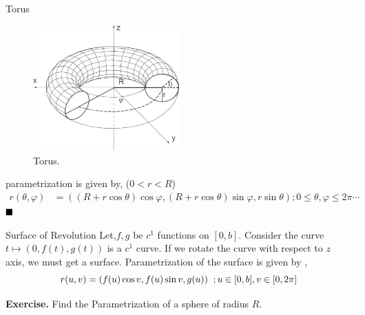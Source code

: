\documentclass[Analysis-3]{subfiles}
\begin{document}
\begin{Eg}{Torus}{}
    
    \begin{figure}[H]
        \centering
        \includegraphics[width=0.5\textwidth]{figures/lec-24.3.png}
        \caption{Torus.}
    \end{figure}

    parametrization is given by, ($0<r<R$)
    \begin{align*} \label{eq:5}
        r(\theta , \varphi) &= ((R+r\cos \theta)\cos \varphi,(R+r\cos \theta)\sin \varphi , r \sin \theta) ; 0\le \theta , \varphi \le 2\pi \cdots 
    \end{align*} $\hfill \blacksquare$
\end{Eg}

\begin{Eg}{Surface of Revolution}{}
   Let,$f,g$ be $c^1$ functions on $[0,b]$. Consider the curve $t \mapsto (0,f(t),g(t))$ is a $c^1$ curve. If we rotate the curve with respect to $z$ axis, we must get a surface. Parametrization  of the surface is given by ,
   \[r(u,v) = (f(u)\cos v,f(u)\sin v,g(u)) \hspace{0.2cm}; u \in [0,b] , v \in [0,2\pi] \]
\end{Eg}

\hspace*{0.5cm} \textbf{Exercise.} Find the Parametrization of a sphere of radius $R$.
\end{document}
